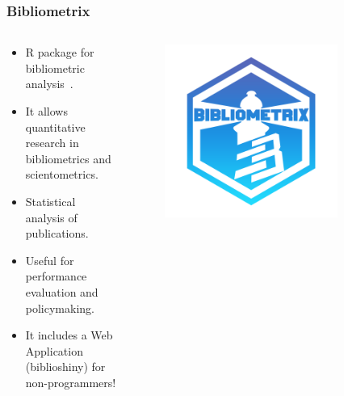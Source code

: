 \documentclass[aspectratio=169]{beamer}
\begin{document}
\begin{frame}
	\frametitle{Bibliometrix}
	\begin{columns}
		\begin{column}{0.5\textwidth}
			\begin{itemize}
				\item R package for bibliometric analysis~\cite{aria2017}.
				\item It allows quantitative research in bibliometrics and
				      scientometrics.
				\item Statistical analysis of publications.
				\item Useful for performance evaluation and policymaking.
				\item It includes a Web Application (biblioshiny) for 
                    non-programmers!
			\end{itemize}
		\end{column}
		\begin{column}{0.5\textwidth}
			\begin{figure}
				\centering
				\includegraphics[width=0.8\textwidth]{logos/bibliometrix.png}
			\end{figure}
		\end{column}
	\end{columns}
\end{frame}
\end{document}
